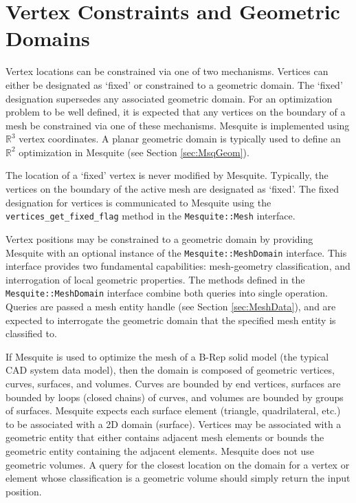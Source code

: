 \section{Vertex Constraints and Geometric Domains} \label{sec:geom}

Vertex locations can be constrained via one of two mechanisms.  Vertices can
either be designated as `fixed' or constrained to a geometric domain.  The
`fixed' designation supersedes any associated geometric domain.  For an
optimization problem to be well defined, it is expected that any vertices on the
boundary of a mesh be constrained via one of these mechanisms.  Mesquite is 
implemented using $\mathbb{R}^{3}$ vertex coordinates.  A planar geometric domain
is typically used to define an $\mathbb{R}^{2}$ optimization in Mesquite 
(see Section \ref{sec:MsqGeom}).

The location of a `fixed' vertex is never modified by Mesquite.  Typically, the 
vertices on the boundary of the active mesh are designated as `fixed'.  The fixed
designation for vertices is communicated to Mesquite using the
\texttt{vertices\_get\_fixed\_flag} method in the \texttt{Mesquite::Mesh} interface.

Vertex positions may be constrained to a geometric domain by providing Mesquite
with an optional instance of the \texttt{Mesquite::MeshDomain} interface.  This
interface provides two fundamental capabilities: mesh-geometry classification,
and interrogation of local geometric properties.  The methods defined in the 
\texttt{Mesquite::MeshDomain} interface combine both queries into single
operation.  Queries are passed a mesh entity handle (see Section \ref{sec:MeshData}),
and are expected to interrogate the geometric domain that the specified mesh
entity is classified to.

If Mesquite is used to optimize the mesh of a B-Rep solid model (the typical CAD
system data model), then the domain is composed of geometric vertices,
curves, surfaces, and volumes.  Curves are bounded by end vertices, surfaces are
bounded by loops (closed chains) of curves, and volumes are bounded by groups of
surfaces.  Mesquite expects each surface element (triangle, quadrilateral, etc.)
to be associated with a 2D domain (surface).  Vertices may be associated with
a geometric entity that either contains adjacent mesh elements or bounds the
geometric entity containing the adjacent elements. Mesquite does not use 
geometric volumes.  A query for the closest location on the domain for a vertex 
or element whose classification is a geometric volume should simply return the 
input position.  

